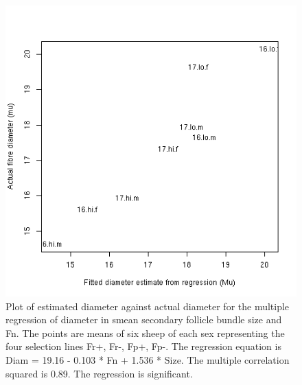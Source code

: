 %

\begin{figure}[!h]
  \centering
   \includegraphics[width=1.0\textwidth]{1617multireg.png}
  \caption{Plot of estimated diameter against actual diameter for the multiple regression of diameter in smean secondary follicle bundle size and Fn.  The points are means of six sheep of each sex representing the four selection lines Fr+, Fr-, Fp+, Fp-. The regression equation is  Diam = 19.16 - 0.103 * Fn + 1.536 * Size. The multiple correlation squared is 0.89. The regression is significant.}
  \label{fig:multireg}
\end{figure}

%

